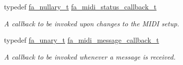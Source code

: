 \begin{DoxyCompactItemize}
typedef \hyperlink{group___fa_ga43b940a9294fd58a54087ef0b416e479}{fa\-\_\-nullary\-\_\-t} \hyperlink{group___fa_midi_gacc769aa23b097e8b8dc3d4807b9a066d}{fa\-\_\-midi\-\_\-status\-\_\-callback\-\_\-t}
\begin{DoxyCompactList}\small\item\em A callback to be invoked upon changes to the M\-I\-D\-I setup. \end{DoxyCompactList}\item 
typedef \hyperlink{group___fa_gaaafae8ab9ebae9019133108e56d2d4d1}{fa\-\_\-unary\-\_\-t} \hyperlink{group___fa_midi_ga446c3043288f44554ba1c69ab03f4a1d}{fa\-\_\-midi\-\_\-message\-\_\-callback\-\_\-t}
\begin{DoxyCompactList}\small\item\em A callback to be invoked whenever a message is received. \end{DoxyCompactList}\end{DoxyCompactItemize}
